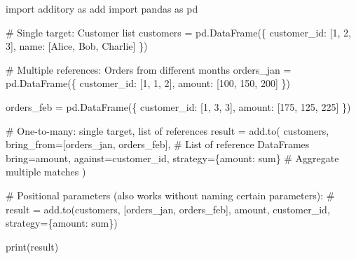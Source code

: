 \documentclass[
  letterpaper,
]{scrbook}
\newenvironment{Shaded}{\begin{snugshade}}{\end{snugshade}}
\newcommand{\BuiltInTok}[1]{\textcolor[rgb]{0.00,0.23,0.31}{#1}}
\newcommand{\CommentTok}[1]{\textcolor[rgb]{0.37,0.37,0.37}{#1}}
\newcommand{\DecValTok}[1]{\textcolor[rgb]{0.68,0.00,0.00}{#1}}
\newcommand{\ImportTok}[1]{\textcolor[rgb]{0.00,0.46,0.62}{#1}}
\newcommand{\NormalTok}[1]{\textcolor[rgb]{0.00,0.23,0.31}{#1}}
\newcommand{\OperatorTok}[1]{\textcolor[rgb]{0.37,0.37,0.37}{#1}}
\newcommand{\StringTok}[1]{\textcolor[rgb]{0.13,0.47,0.30}{#1}}
\begin{document}
\begin{Shaded}
\begin{Highlighting}[]
\ImportTok{import}\NormalTok{ additory }\ImportTok{as}\NormalTok{ add}
\ImportTok{import}\NormalTok{ pandas }\ImportTok{as}\NormalTok{ pd}

\CommentTok{\# Single target: Customer list}
\NormalTok{customers }\OperatorTok{=}\NormalTok{ pd.DataFrame(\{}
    \StringTok{\textquotesingle{}customer\_id\textquotesingle{}}\NormalTok{: [}\DecValTok{1}\NormalTok{, }\DecValTok{2}\NormalTok{, }\DecValTok{3}\NormalTok{],}
    \StringTok{\textquotesingle{}name\textquotesingle{}}\NormalTok{: [}\StringTok{\textquotesingle{}Alice\textquotesingle{}}\NormalTok{, }\StringTok{\textquotesingle{}Bob\textquotesingle{}}\NormalTok{, }\StringTok{\textquotesingle{}Charlie\textquotesingle{}}\NormalTok{]}
\NormalTok{\})}

\CommentTok{\# Multiple references: Orders from different months}
\NormalTok{orders\_jan }\OperatorTok{=}\NormalTok{ pd.DataFrame(\{}
    \StringTok{\textquotesingle{}customer\_id\textquotesingle{}}\NormalTok{: [}\DecValTok{1}\NormalTok{, }\DecValTok{1}\NormalTok{, }\DecValTok{2}\NormalTok{],}
    \StringTok{\textquotesingle{}amount\textquotesingle{}}\NormalTok{: [}\DecValTok{100}\NormalTok{, }\DecValTok{150}\NormalTok{, }\DecValTok{200}\NormalTok{]}
\NormalTok{\})}

\NormalTok{orders\_feb }\OperatorTok{=}\NormalTok{ pd.DataFrame(\{}
    \StringTok{\textquotesingle{}customer\_id\textquotesingle{}}\NormalTok{: [}\DecValTok{1}\NormalTok{, }\DecValTok{3}\NormalTok{, }\DecValTok{3}\NormalTok{],}
    \StringTok{\textquotesingle{}amount\textquotesingle{}}\NormalTok{: [}\DecValTok{175}\NormalTok{, }\DecValTok{125}\NormalTok{, }\DecValTok{225}\NormalTok{]}
\NormalTok{\})}

\CommentTok{\# One{-}to{-}many: single target, list of references}
\NormalTok{result }\OperatorTok{=}\NormalTok{ add.to(}
\NormalTok{    customers,}
\NormalTok{    bring\_from}\OperatorTok{=}\NormalTok{[orders\_jan, orders\_feb],    }\CommentTok{\# List of reference DataFrames}
\NormalTok{    bring}\OperatorTok{=}\StringTok{\textquotesingle{}amount\textquotesingle{}}\NormalTok{,}
\NormalTok{    against}\OperatorTok{=}\StringTok{\textquotesingle{}customer\_id\textquotesingle{}}\NormalTok{,}
\NormalTok{    strategy}\OperatorTok{=}\NormalTok{\{}\StringTok{\textquotesingle{}amount\textquotesingle{}}\NormalTok{: }\StringTok{\textquotesingle{}sum\textquotesingle{}}\NormalTok{\}              }\CommentTok{\# Aggregate multiple matches}
\NormalTok{)}

\CommentTok{\# Positional parameters (also works without naming certain parameters):}
\CommentTok{\# result = add.to(customers, [orders\_jan, orders\_feb], \textquotesingle{}amount\textquotesingle{}, \textquotesingle{}customer\_id\textquotesingle{}, strategy=\{\textquotesingle{}amount\textquotesingle{}: \textquotesingle{}sum\textquotesingle{}\})}

\BuiltInTok{print}\NormalTok{(result)}
\end{Highlighting}
\end{Shaded}
\end{document}
